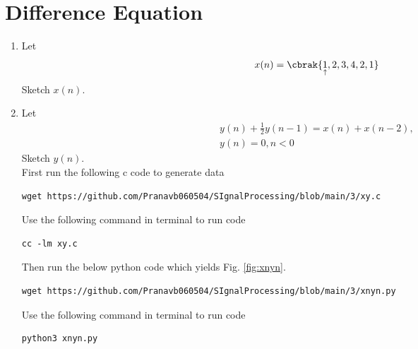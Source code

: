 \documentclass[journal,12pt,twocolumn]{IEEEtran}
\renewcommand\thesection{\arabic{section}}
\begin{document}
\section{Difference Equation}
\begin{enumerate}[label=\thesection.\arabic*,ref=\thesection.\theenumi]
\item Let
\begin{equation}
x(n) = \cbrak{\underset{\uparrow}{1},2,3,4,2,1}
\end{equation}
Sketch $x(n)$.
\item Let
\begin{multline}
\label{eq:iir_filter}
y(n) + \frac{1}{2}y(n-1) = x(n) + x(n-2), 
\\
 y(n) = 0, n < 0
\end{multline}
Sketch $y(n)$.
\\
\solution
First run the following c code to generate data
\begin{lstlisting}
wget https://github.com/Pranavb060504/SIgnalProcessing/blob/main/3/xy.c
\end{lstlisting}
Use the following command in terminal to run code
\begin{lstlisting}
cc -lm xy.c
\end{lstlisting}
Then run the below python code which yields Fig. \ref{fig:xnyn}.
\begin{lstlisting}
wget https://github.com/Pranavb060504/SIgnalProcessing/blob/main/3/xnyn.py
\end{lstlisting}
Use the following command in terminal to run code
\begin{lstlisting}
python3 xnyn.py
\end{lstlisting}

\end{enumerate}
\end{document}
